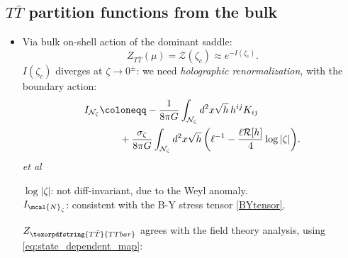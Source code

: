 \documentclass[10pt]{article}
\newcommand{\TTbar}{\texorpdfstring{\ensuremath{T\bar{T}}}{TTbar}\xspace}
\begin{document}
\begin{multicols}{3}
\begin{itemize}
\end{itemize}

\subsection*{\TTbar partition functions from the bulk} \label{se:partitionfunction}

\begin{itemize}
\item Via bulk on-shell action of the dominant saddle:
	\begin{equation}
		Z_{T\bar T} (\mu) = \mathcal Z (\zeta_c) \approx  e^{-I(\zeta_c)}. \label{partition2}
	\end{equation}
$I(\zeta_c)$ \mbox{diverges} at $\zeta \to 0^\pm$: we need \textit{holographic renormalization}, with the boundary action:
	\begin{align}
		I_{\mathcal N_{\zeta}} & \coloneqq  - \frac{1}{8\pi G} \int_{\mathcal N_{\zeta}} d^2x \sqrt{h}\,h^{ij} K_{ij} \label{boundaryaction}
	\\& \qquad + \frac{\sigma_\zeta}{8\pi G} \int_{\mathcal N_{\zeta}} d^2x \sqrt{h} \, \bigg(\ell^{-1} - \frac{\ell  \mathcal{R}[h]}{4} \log |\zeta| \bigg). \notag
	\end{align}
	\hfill{\footnotesize \textcite{Henningson:1998gx} \textit{et al}}

	$\log |\zeta|$: not diff-invariant, due to the Weyl anomaly. \\
	$I_{\mcal{N}_\zeta}$: consistent with the B-Y stress tensor \eqref{BYtensor}.
	
	$Z_{\TTbar}$ agrees with the field theory analysis, using \eqref{eq:state_dependent_map}:


\end{itemize}
\end{multicols}
\end{document}
